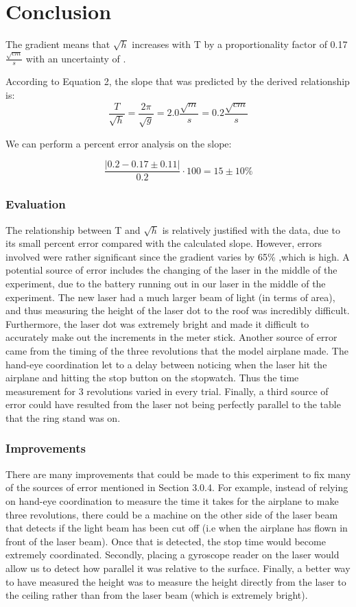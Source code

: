 \documentclass[10pt, letterpaper]{article}
\begin{document}
\section{Conclusion}
The gradient means that $\sqrt{h}$ increases with T by a proportionality factor of 0.17 $\frac{\sqrt{cm}}{s}$
with an uncertainty of .

According to Equation 2, the slope that was predicted by the derived relationship is:
\[ \frac{T}{\sqrt{h}} = \frac{2\pi }{\sqrt{g}} = 2.0 \frac{\sqrt{m}}{s} = 0.2 \frac{\sqrt{cm}}{s} \]

We can perform a percent error analysis on the slope:

\[ \frac{|0.2 - 0.17 \pm 0.11|}{0.2} \cdot 100 = 15 \pm 10 \% \]

\subsubsection{Evaluation}
The relationship between T and $\sqrt{h}$ is relatively justified with the data, due to its small percent error compared with the calculated slope.
However, errors involved were rather significant since the gradient varies by 65\% ,which is high. A potential source of error includes the changing of
the laser in the middle of the experiment, due to the battery running out in our laser in the middle of the experiment. The new laser had a much larger
beam of light (in terms of area), and thus measuring the height of the laser dot to the roof was incredibly difficult. Furthermore, the laser dot was
extremely bright and made it difficult to accurately make out the increments in the meter stick. Another source of error came from the timing of the
three revolutions that the model airplane made. The hand-eye coordination let to a delay between noticing when the laser hit the airplane and hitting
the stop button on the stopwatch. Thus the time measurement for 3 revolutions varied in every trial. Finally, a third source of error could have resulted
from the laser not being perfectly parallel to the table that the ring stand was on.

\subsubsection{Improvements}
There are many improvements that could be made to this experiment to fix many of the sources of error mentioned in Section 3.0.4. For example, instead of
relying on hand-eye coordination to measure the time it takes for the airplane to make three revolutions, there could be a machine on the other side of the
laser beam that detects if the light beam has been cut off (i.e when the airplane has flown in front of the laser beam). Once that is detected, the stop time
would become extremely coordinated. Secondly, placing a gyroscope reader on the laser would allow us to detect how parallel it was relative to the surface.
Finally, a better way to have measured the height was to measure the height directly from the laser to the ceiling rather than from the laser beam (which is
extremely bright).
\end{document}
